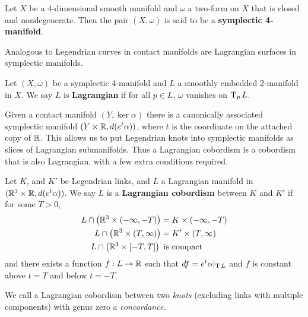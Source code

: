 \begin{definition}
    Let $X$ be a 4-dimensional smooth manifold and $\omega$ a two-form on $X$ that is closed and nondegenerate. Then the pair $(X, \omega)$ is said to be a \textbf{symplectic 4-manifold}.
\end{definition}

Analogous to Legendrian curves in contact manifolds are Lagrangian surfaces in symplectic manifolds.
\begin{definition}
    Let $(X, \omega)$ be a symplectic 4-manifold and $L$ a smoothly embedded 2-manifold in $X$. We say $L$ is \textbf{Lagrangian} if for all $p \in L$, $\omega$ vanishes on $\operatorname{T}_p L$.
\end{definition}


Given a contact manifold $(Y, \ker \alpha)$ there is a canonically associated symplectic manifold $(Y \times \mathbb{R}, d(e^t \alpha))$, where $t$ is the coordinate on the attached copy of $\mathbb{R}$. This allows us to put Legendrian knots into symplectic manifolds as slices of Lagrangian submanifolds. Thus a Lagrangian cobordism is a cobordism that is also Lagrangian, with a few extra conditions required.

\begin{definition}
    Let $K$, and $K'$ be Legendrian links, and $L$ a Lagrangian manifold in $(\mathbb{R}^3 \times \mathbb{R}, d(e^t \alpha))$. We say $L$ is a \textbf{Lagrangian cobordism} between $K$ and $K'$ if for some $T > 0$,
    \begin{align*}
        L \cap \left(\mathbb{R}^3 \times (-\infty, -T)\right) &= K \times (-\infty, -T)\\
        L \cap \left(\mathbb{R}^3 \times (T, \infty)\right) &= K' \times (T, \infty)\\
        L \cap \left(\mathbb{R}^3 \times [-T, T] \right)\, &\,\, \text{is compact}
    \end{align*}
    and there exists a function $f: L \to \mathbb{R}$ such that $df = e^t \alpha |_{\operatorname{T} L}$ and $f$ is constant above $t = T$ and below $t = -T$.

    We call a Lagrangian cobordism between two \emph{knots} (excluding links with multiple components) with genus zero a \emph{concordance.}
\end{definition}

